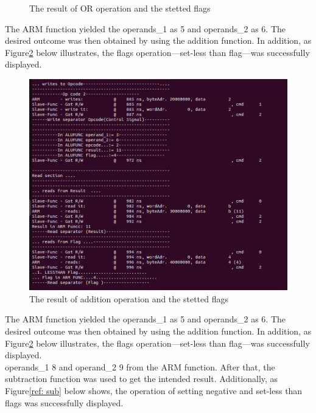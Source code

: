 \documentclass[a4paper,12pt,english]{report}
\begin{document}
\begin{enumerate}
\begin{figure}[ht]
	\caption{The result of OR operation and the stetted flags}
	\label{ref:OR}
\end{figure}
\newpage
The ARM function yielded the operands\_1 as 5 and operands\_2 as 6. The desired outcome was then obtained by using the addition function. In addition, as Figure\ref{ref:add} below illustrates, the flags operation—set-less than flag—was successfully displayed.\\
\begin{figure}[ht]
	\centering
	\includegraphics[width=1\textwidth]{ADD} %
	\caption{The result of addition operation and the stetted flags}
	\label{ref:add}
\end{figure}
\newpage
The ARM function yielded the operands\_1 as 5 and operands\_2 as 6. The desired outcome was then obtained by using the addition function. In addition, as Figure\ref{ref:add} below illustrates, the flags operation—set-less than flag—was successfully displayed.\\ operands\_1 8 and operand\_2 9 from the ARM function. After that, the subtraction function was used to get the intended result. Additionally, as Figure\ref{ref: sub} below shows, the operation of setting negative and set-less than flags was successfully displayed.\\
\begin{figure}[ht]
	\centering

\end{figure}
\end{enumerate}
\end{document}
